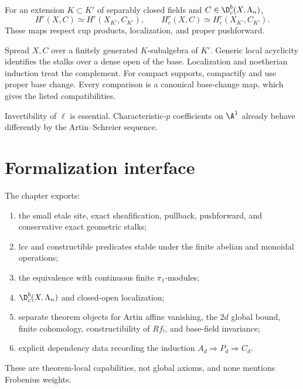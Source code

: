 \begin{theorem}
\label{thm:base-field-invariance}
For an extension \(K\subset K'\) of separably closed fields and
\(C\in\D^b_c(X,\Lambda_n)\),
\[
 H^r(X,C)\simeq H^r(X_{K'},C_{K'}),\qquad
 H^r_c(X,C)\simeq H^r_c(X_{K'},C_{K'}).
\]
These maps respect cup products, localization, and proper pushforward.
\end{theorem}

\begin{foundation}
Spread \(X,C\) over a finitely generated \(K\)-subalgebra of \(K'\).
Generic local acyclicity identifies the stalks over a dense open of the base.
Localization and noetherian induction treat the complement.  For compact
supports, compactify and use proper base change.  Every comparison is a
canonical base-change map, which gives the listed compatibilities.
\end{foundation}

\begin{warning}
Invertibility of \(\ell\) is essential.  Characteristic-\(p\) coefficients on
\(\A^1\) already behave differently by the Artin--Schreier sequence.
\end{warning}

\section{Formalization interface}

\begin{formalization}
The chapter exports:
\begin{enumerate}
\item the small etale site, exact sheafification, pullback, pushforward, and
      conservative exact geometric stalks;
\item lcc and constructible predicates stable under the finite abelian and
      monoidal operations;
\item the equivalence with continuous finite \(\pi_1\)-modules;
\item \(\D^b_c(X,\Lambda_n)\) and closed-open localization;
\item separate theorem objects for Artin affine vanishing, the \(2d\) global
      bound, finite cohomology, constructibility of \(Rf_!\), and base-field
      invariance;
\item explicit dependency data recording the induction
      \(A_d\Rightarrow P_d\Rightarrow C_d\).
\end{enumerate}
These are theorem-local capabilities, not global axioms, and none mentions
Frobenius weights.
\end{formalization}
